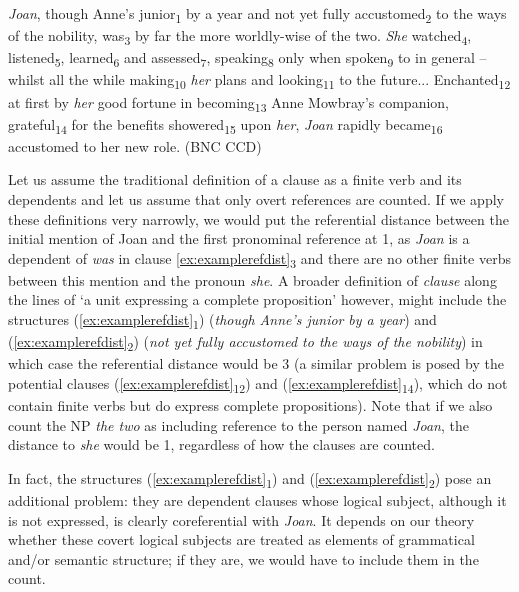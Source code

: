 \begin{exe}
\ex \textit{Joan}, though Anne's junior\textsubscript{1} by a year and not yet fully accustomed\textsubscript{2} to the ways of the nobility, was\textsubscript{3} by far the more worldly-wise of the two. \textit{She} watched\textsubscript{4}, listened\textsubscript{5}, learned\textsubscript{6} and assessed\textsubscript{7}, speaking\textsubscript{8} only when spoken\textsubscript{9} to in general -- whilst all the while making\textsubscript{10} \textit{her} plans and looking\textsubscript{11} to the future... Enchanted\textsubscript{12} at first by \textit{her} good fortune in becoming\textsubscript{13} Anne Mowbray's companion, grateful\textsubscript{14} for the benefits showered\textsubscript{15} upon \textit{her}, \textit{Joan} rapidly became\textsubscript{16} accustomed to her new role. (BNC CCD)
\label{ex:examplerefdist}
\end{exe}

Let us assume the traditional definition of a clause as a finite verb and its dependents and let us assume that only overt references are counted. If we apply these definitions very narrowly, we would put the referential distance between the initial mention of Joan and the first pronominal reference at 1, as \textit{Joan} is a dependent of \textit{was} in clause \ref{ex:examplerefdist}\textsubscript{3} and there are no other finite verbs between this mention and the pronoun \textit{she}. A broader definition of \textit{clause} along the lines of `a unit expressing a complete proposition' however, might include the structures (\ref{ex:examplerefdist}\textsubscript{1}) (\textit{though Anne's junior} \textit{by a year}) and (\ref{ex:examplerefdist}\textsubscript{2}) (\textit{not yet fully accustomed to the ways of the nobility}) in which case the referential distance would be 3 (a similar problem is posed by the potential clauses (\ref{ex:examplerefdist}\textsubscript{12}) and (\ref{ex:examplerefdist}\textsubscript{14}), which do not contain finite verbs but do express complete propositions). Note that if we also count the NP \textit{the two} as including reference to the person named \textit{Joan}, the distance to \textit{she} would be 1, regardless of how the clauses are counted.

In fact, the structures (\ref{ex:examplerefdist}\textsubscript{1}) and (\ref{ex:examplerefdist}\textsubscript{2}) pose an additional problem: they are dependent clauses whose logical subject, although it is not expressed, is clearly coreferential with \textit{Joan}. It depends on our theory whether these covert logical subjects are treated as elements of grammatical and/or semantic structure; if they are, we would have to include them in the count.

